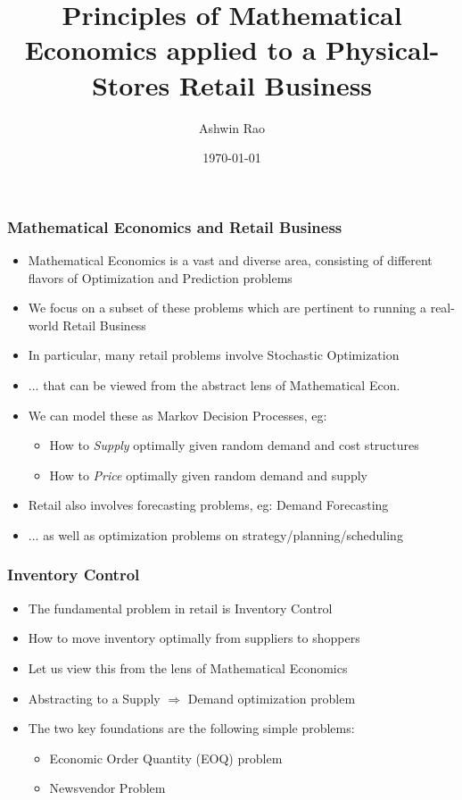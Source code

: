 \documentclass[handout]{beamer}
\title[Mathematical Economics for Retail]{Principles of Mathematical Economics applied to a Physical-Stores Retail Business} %
\author{Ashwin Rao} %
\institute[Stanford] %
{
ICME, Stanford University
}
\date{\today} %
\begin{document}
\begin{frame}
\titlepage %
\end{frame}


\begin{frame}
\frametitle{Mathematical Economics and Retail Business}
\pause
\begin{itemize}[<+->]
\item Mathematical Economics is a vast and diverse area, consisting of different flavors of Optimization and Prediction problems
\item We focus on a subset of these problems which are pertinent to running a real-world Retail Business
\item In particular, many retail problems involve Stochastic Optimization
\item ... that can be viewed from the abstract lens of Mathematical Econ.
\item We can model these as Markov Decision Processes, eg:
\begin{itemize}
\item How to {\em Supply} optimally given random demand and cost structures
\item How to {\em Price} optimally given random demand and supply
\end{itemize}
\item Retail also involves forecasting problems, eg: Demand Forecasting
\item ... as well as optimization problems on strategy/planning/scheduling
\end{itemize}
\end{frame}

\begin{frame}
\frametitle{Inventory Control}
\pause
\begin{itemize}[<+->]
\item The fundamental problem in retail is Inventory Control
\item How to move inventory optimally from suppliers to shoppers
\item Let us view this from the lens of Mathematical Economics
\item Abstracting to a Supply $\Rightarrow$ Demand optimization problem
\item The two key foundations are the following simple problems:
\begin{itemize}
\item Economic Order Quantity (EOQ) problem
\item Newsvendor Problem
\end{itemize}
\end{itemize}
\end{frame}
\end{document}
